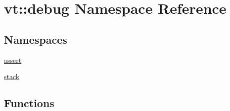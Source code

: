 \hypertarget{namespacevt_1_1debug}{}\section{vt\+:\+:debug Namespace Reference}
\label{namespacevt_1_1debug}
\subsection*{Namespaces}
\begin{DoxyCompactItemize}
\item 
 \hyperlink{namespacevt_1_1debug_1_1assert}{assert}
\item 
 \hyperlink{namespacevt_1_1debug_1_1stack}{stack}
\end{DoxyCompactItemize}
\subsection*{Functions}
